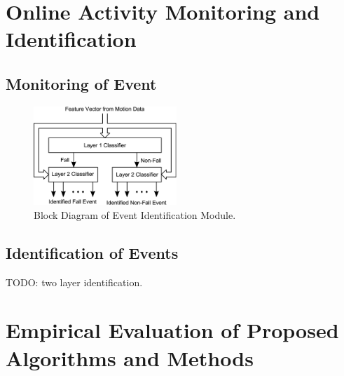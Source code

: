 \documentclass{IEEEtran}
\begin{document}
\section{Online Activity Monitoring and Identification}



\subsection{Monitoring of Event}

\begin{figure}[htbp]
	\centering
		\includegraphics[width=0.48\textwidth]{figures/TrainedIdentificationModule.eps}
	\caption{Block Diagram of Event Identification Module.}
	\label{fig:TrainedIdentificationModule}
\end{figure}


\subsection{Identification of Events}

TODO: two layer identification. 

\section{Empirical Evaluation of Proposed Algorithms and Methods}
\label{Evaluation}
\end{document}

